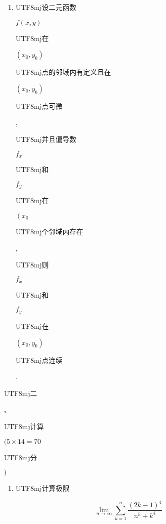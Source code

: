 \documentclass[10pt]{article}
\begin{document}
\begin{enumerate}
  \item \begin{CJK}{UTF8}{mj}设二元函数\end{CJK} $f(x, y)$ \begin{CJK}{UTF8}{mj}在\end{CJK} $\left(x_{0}, y_{0}\right)$ \begin{CJK}{UTF8}{mj}点的邻域内有定义且在\end{CJK} $\left(x_{0}, y_{0}\right)$ \begin{CJK}{UTF8}{mj}点可微\end{CJK}, \begin{CJK}{UTF8}{mj}并且偏导数\end{CJK} $f_{x}$ \begin{CJK}{UTF8}{mj}和\end{CJK} $f_{y}$ \begin{CJK}{UTF8}{mj}在\end{CJK} $\left(x_{0}\right.$ \begin{CJK}{UTF8}{mj}个邻域内存在\end{CJK}, \begin{CJK}{UTF8}{mj}则\end{CJK} $f_{x}$ \begin{CJK}{UTF8}{mj}和\end{CJK} $f_{y}$ \begin{CJK}{UTF8}{mj}在\end{CJK} $\left(x_{0}, y_{0}\right)$ \begin{CJK}{UTF8}{mj}点连续\end{CJK}.

\end{enumerate}
\begin{CJK}{UTF8}{mj}二\end{CJK}、\begin{CJK}{UTF8}{mj}计算\end{CJK} $(5 \times 14=70$ \begin{CJK}{UTF8}{mj}分\end{CJK} $)$

\begin{enumerate}
  \item \begin{CJK}{UTF8}{mj}计算极限\end{CJK}
\end{enumerate}
$$
\lim _{n \rightarrow \infty} \sum_{k=1}^{n} \frac{(2 k-1)^{4}}{n^{5}+k^{4}}
$$
\end{document}
